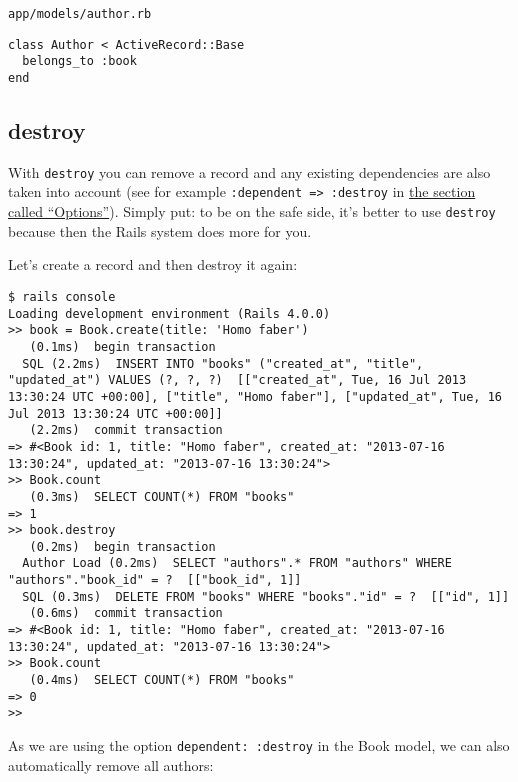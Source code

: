\documentclass[a4paper]{book}
\begin{document}
\texttt{app/models/author.rb}

\begin{shaded}\begin{verbatim}
class Author < ActiveRecord::Base
  belongs_to :book
end
\end{verbatim}\end{shaded}

\subsection{destroy}\label{destroy}

With \texttt{destroy} you can remove a record and any existing dependencies are also taken into account (see for example \texttt{:dependent =\textgreater{} :destroy} in \hyperref[activerecordux5f1nux5foptionen]{the section called “Options”}). Simply put: to be on the safe side, it's better to use \texttt{destroy} because then the Rails system does more for you.

Let's create a record and then destroy it again:

\begin{shaded}\begin{verbatim}
$ rails console
Loading development environment (Rails 4.0.0)
>> book = Book.create(title: 'Homo faber')
   (0.1ms)  begin transaction
  SQL (2.2ms)  INSERT INTO "books" ("created_at", "title", "updated_at") VALUES (?, ?, ?)  [["created_at", Tue, 16 Jul 2013 13:30:24 UTC +00:00], ["title", "Homo faber"], ["updated_at", Tue, 16 Jul 2013 13:30:24 UTC +00:00]]
   (2.2ms)  commit transaction
=> #<Book id: 1, title: "Homo faber", created_at: "2013-07-16 13:30:24", updated_at: "2013-07-16 13:30:24">
>> Book.count
   (0.3ms)  SELECT COUNT(*) FROM "books"
=> 1
>> book.destroy
   (0.2ms)  begin transaction
  Author Load (0.2ms)  SELECT "authors".* FROM "authors" WHERE "authors"."book_id" = ?  [["book_id", 1]]
  SQL (0.3ms)  DELETE FROM "books" WHERE "books"."id" = ?  [["id", 1]]
   (0.6ms)  commit transaction
=> #<Book id: 1, title: "Homo faber", created_at: "2013-07-16 13:30:24", updated_at: "2013-07-16 13:30:24">
>> Book.count
   (0.4ms)  SELECT COUNT(*) FROM "books"
=> 0
>>
\end{verbatim}\end{shaded}

As we are using the option \texttt{dependent: :destroy} in the Book model, we can also automatically remove all authors:
\end{document}
